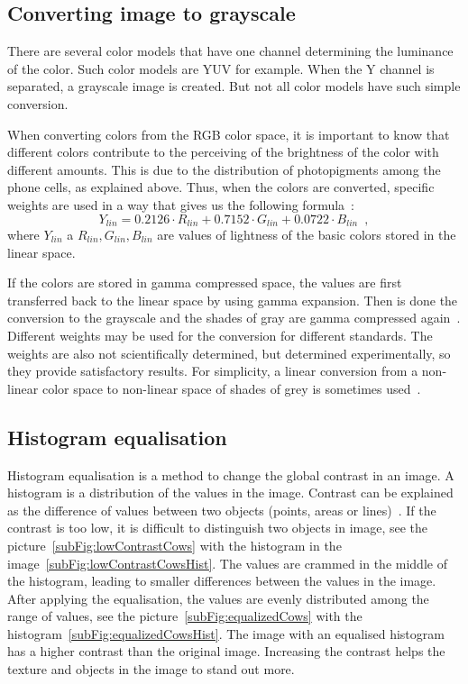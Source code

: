 \documentclass[thesis=B,english]{FITthesis}[2019/12/23]
\begin{document}
        \subsection{Converting image to grayscale}
            There are several color models that have one channel determining the luminance of the color. Such color models are YUV for example. When the Y channel is separated, a grayscale image is created. But not all color models have such simple conversion.
            
            When converting colors from the RGB color space, it is important to know that different colors contribute to the perceiving of the brightness of the color with different amounts. This is due to the distribution of photopigments among the phone cells, as explained above. Thus, when the colors are converted, specific weights are used in a way that gives us the following formula~\cite{Poynton28November2006}:
            \begin{equation}
                Y_{lin} = 0.2126 \cdot R_{lin} + 0.7152 \cdot G_{lin} + 0.0722 \cdot B_{lin} \enspace ,
            \end{equation} \label{eq:weightedRGBtoGrey}
            where \(Y_{lin}\) a \(R_{lin}, G_{lin}, B_{lin}\) are values of lightness of the basic colors stored in the linear space.
            
            If the colors are stored in gamma compressed space, the values are first transferred back to the linear space by using gamma expansion. Then is done the conversion to the grayscale and the shades of gray are gamma compressed again~\cite{NPlDwZHLJCEKbaXV}. Different weights may be used for the conversion for different standards. The weights are also not scientifically determined, but determined experimentally, so they provide satisfactory results. For simplicity, a linear conversion from a non-linear color space to non-linear space of shades of grey is sometimes used~\cite{Poynton28November2006}.
            
        \subsection{Histogram equalisation}
            Histogram equalisation is a method to change the global contrast in an image. A histogram is a distribution of the values in the image. Contrast can be explained as the difference of values between two objects (points, areas or lines)~\cite{X3IOSjMG1S81OB7w}. If the contrast is too low, it is difficult to distinguish two objects in image, see the picture~\ref{subFig:lowContrastCows} with the histogram in the image~\ref{subFig:lowContrastCowsHist}. The values are crammed in the middle of the histogram, leading to smaller differences between the values in the image. After applying the equalisation, the values are evenly distributed among the range of values, see the picture~\ref{subFig:equalizedCows} with the histogram~\ref{subFig:equalizedCowsHist}. The image with an equalised histogram has a higher contrast than the original image. Increasing the contrast helps the texture and objects in the image to stand out more.
            
\end{document}
